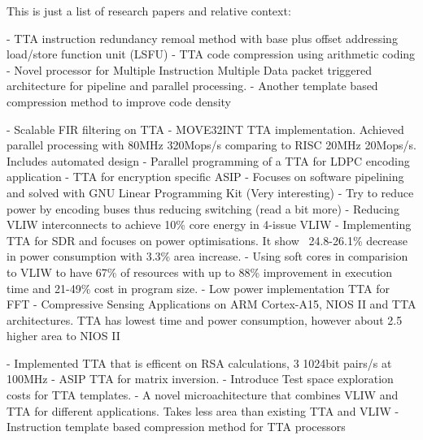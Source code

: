 \iffalse
This chapter describes your Goals and Objectives. 
Indicate how your work is intended to expand on previous historical work.
Present your motivations; why are you doing this?
Indicate the type of project you have(see the list above).

Types of Projects:
2) Design and Construction projects:
These types of projects involve the design and construction of some 
electrical or electronic apparatus or device within the bounds 
of the department's educational mandate.
\fi


This is just a list of research papers and relative context:


\autocite{5403730} - TTA instruction redundancy remoal method with base plus offset addressing load/store function unit (LSFU)
\autocite{4627144} - TTA code compression using arithmetic coding
\autocite{5936440} - Novel processor for Multiple Instruction Multiple Data packet triggered architecture for pipeline and parallel processing.
\autocite{1213033} - Another template based compression method to improve code density


\autocite{1511285} - Scalable FIR filtering on TTA
\autocite{289981} - MOVE32INT TTA implementation. Achieved parallel processing with 80MHz 320Mops/s comparing to RISC 20MHz 20Mops/s. Includes automated design
\autocite{6855236} - Parallel programming of a TTA for LDPC encoding application
\autocite{922340} - TTA for encryption specific ASIP
\autocite{4595596} - Focuses on software pipelining and solved with GNU Linear Programming Kit (Very interesting)
\autocite{1207041} - Try to reduce power by encoding buses thus reducing switching (read a bit more)
\autocite{6972455} - Reducing VLIW interconnects to achieve 10\% core energy in 4-issue VLIW
\autocite{7363689} - Implementing TTA for SDR and focuses on power optimisations. It show ~24.8-26.1\% decrease in power consumption with 3.3\% area increase.
\autocite{8425389} - Using soft cores in comparision to VLIW to have 67\% of resources with up to 88\% improvement in execution time and 21-49\% cost in program size.
\autocite{8682289} - Low power implementation TTA for FFT
\autocite{8573494} - Compressive Sensing Applications on ARM Cortex-A15, NIOS II and TTA architectures. TTA has lowest time and power consumption, however about 2.5 higher area to NIOS II

\autocite{6128530} - Implemented TTA that is efficent on RSA calculations, 3 1024bit pairs/s at 100MHz
\autocite{1540373} - ASIP TTA for matrix inversion.
\autocite{840031}  - Introduce Test space exploration costs for TTA templates.
\autocite{6403142} - A novel microachitecture that combines VLIW and TTA for different applications. Takes less area than existing TTA and VLIW
\autocite{6893206} - Instruction template based compression method for TTA processors

